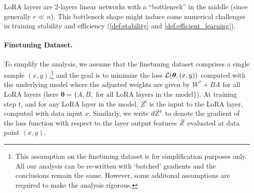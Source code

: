 LoRA layers are 2-layers linear networks with a ``bottleneck'' in the middle (since generally $r\ll n$). This bottleneck shape might induce some numerical challenges in training stability and efficiency (\cref{def:stability} and \cref{def:efficient_learning}). 
\vspace{-0.3cm}
\paragraph{Finetuning Dataset.} To simplify the analysis, we assume that the finetuning dataset comprises a single sample $(x,y)$,\footnote{This assumption on the finetuning dataset is for simplification purposes only. All our analysis can be re-written with `batched' gradients and the conclusions remain the same. However, some additonal assumptions are required to make the analysis rigorous.} and the goal is to minimize the loss $\mathcal{L}(\bm{\theta},(x,y))$ computed with the underlying model where the adjusted weights are given by $W^{*} + BA$ for all LoRA layers (here $\bm{\theta} = \{A, B, \textrm{ for all LoRA layers in the model}\}$). At training step $t$, and for any LoRA layer in the model, $\underbar{Z}^t$ is the input to the LoRA layer, computed with data input $x$. Similarly, we write $d \Bar{Z}^t$ to denote the gradient of the loss function with respect to the layer output features $\Bar{Z}$ evaluated at data point $(x,y)$. 

